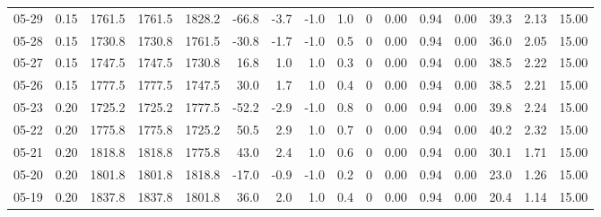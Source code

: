 \begin{threeparttable}
{\begin{tabular}{lrrrrrrrrrrrrrrr}
  05-29 &     0.15 & 1761.5 & 1761.5 & 1828.2 &      -66.8 &           -3.7 &                     -1.0 &                 1.0 &              0 &       0.00 &      0.94 &           0.00 &             39.3 &            2.13 &                  15.00 \\
  05-28 &     0.15 & 1730.8 & 1730.8 & 1761.5 &      -30.8 &           -1.7 &                     -1.0 &                 0.5 &              0 &       0.00 &      0.94 &           0.00 &             36.0 &            2.05 &                  15.00 \\
  05-27 &     0.15 & 1747.5 & 1747.5 & 1730.8 &       16.8 &            1.0 &                      1.0 &                 0.3 &              0 &       0.00 &      0.94 &           0.00 &             38.5 &            2.22 &                  15.00 \\
  05-26 &     0.15 & 1777.5 & 1777.5 & 1747.5 &       30.0 &            1.7 &                      1.0 &                 0.4 &              0 &       0.00 &      0.94 &           0.00 &             38.5 &            2.21 &                  15.00 \\
  05-23 &     0.20 & 1725.2 & 1725.2 & 1777.5 &      -52.2 &           -2.9 &                     -1.0 &                 0.8 &              0 &       0.00 &      0.94 &           0.00 &             39.8 &            2.24 &                  15.00 \\
  05-22 &     0.20 & 1775.8 & 1775.8 & 1725.2 &       50.5 &            2.9 &                      1.0 &                 0.7 &              0 &       0.00 &      0.94 &           0.00 &             40.2 &            2.32 &                  15.00 \\
  05-21 &     0.20 & 1818.8 & 1818.8 & 1775.8 &       43.0 &            2.4 &                      1.0 &                 0.6 &              0 &       0.00 &      0.94 &           0.00 &             30.1 &            1.71 &                  15.00 \\
  05-20 &     0.20 & 1801.8 & 1801.8 & 1818.8 &      -17.0 &           -0.9 &                     -1.0 &                 0.2 &              0 &       0.00 &      0.94 &           0.00 &             23.0 &            1.26 &                  15.00 \\
  05-19 &     0.20 & 1837.8 & 1837.8 & 1801.8 &       36.0 &            2.0 &                      1.0 &                 0.4 &              0 &       0.00 &      0.94 &           0.00 &             20.4 &            1.14 &                  15.00 \\

\end{tabular}}
\end{threeparttable}
